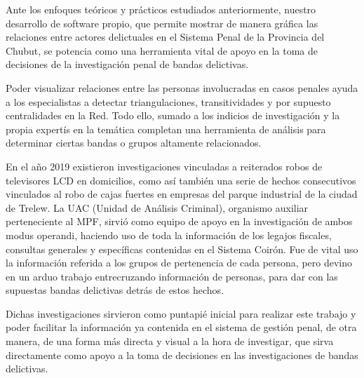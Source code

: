 Ante los enfoques teóricos y prácticos estudiados anteriormente, nuestro desarrollo de software propio, que permite mostrar de manera gráfica las relaciones entre actores delictuales en el Sistema Penal de la Provincia del Chubut, se potencia como una herramienta vital de apoyo en la toma de decisiones de la investigación penal de bandas delictivas.

Poder visualizar relaciones entre las personas involucradas en casos penales ayuda a los especialistas a detectar triangulaciones, transitividades y por supuesto centralidades en la Red. Todo ello, sumado a los indicios de investigación y la propia expertís en la temática completan una herramienta de análisis para determinar ciertas bandas o grupos altamente relacionados.

En el año 2019 existieron investigaciones vinculadas a reiterados robos de televisores LCD en domicilios, como así también una serie de hechos consecutivos vinculados al robo de cajas fuertes en empresas del parque industrial de la ciudad de Trelew.
La UAC (Unidad de Análisis Criminal), organismo auxiliar perteneciente al MPF, sirvió como equipo de apoyo en la investigación de ambos modus operandi, haciendo uso de toda la información de los legajos fiscales, consultas generales y específicas contenidas en el Sistema Coirón. Fue de vital uso la información referida a los grupos de pertenencia de cada persona, pero devino en un arduo trabajo entrecruzando información de personas, para dar con las supuestas bandas delictivas detrás de estos hechos.

Dichas investigaciones sirvieron como puntapié inicial para realizar este trabajo y poder facilitar la información ya contenida en el sistema de gestión penal, de otra manera, de una forma más directa y visual a la hora de investigar, que sirva directamente como apoyo a la toma de decisiones en las investigaciones de bandas delictivas. 